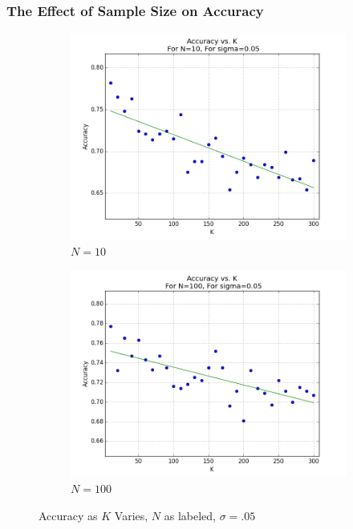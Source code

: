 \documentclass{article}
\begin{document}
\subsubsection{The Effect of Sample Size on Accuracy}
\begin{figure}[H]
    \centering
    \begin{subfigure}[h]{0.45\textwidth}
        \includegraphics[width=\textwidth]{l-experiment1-2-accuracy-k-n-10-s-005.png}
        \caption{$N=10$}
        \label{fig:exp2k1}
    \end{subfigure}
   \begin{subfigure}[h]{0.45\textwidth}
        \includegraphics[width=\textwidth]{l-experiment1-2-accuracy-k-n-100-s-005.png}
        \caption{$N=100$}
        \label{fig:exp2k2}
    \end{subfigure}
    \caption{Accuracy as $K$ Varies, $N$ as labeled, $\sigma=.05$}\label{fig:exp1-2-accuracy-k}
\end{figure}
\end{document}
